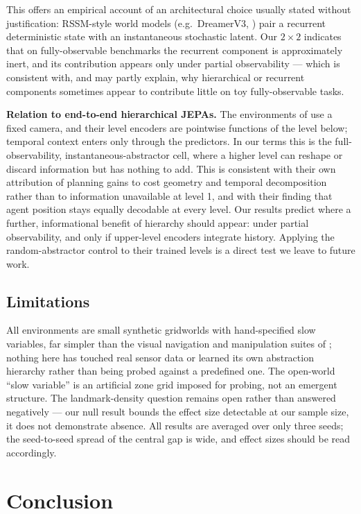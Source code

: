\documentclass[11pt]{article}
\begin{document}
This offers an empirical account of an architectural choice usually stated without justification: RSSM-style world models (e.g.\ DreamerV3, \citealp{hafner2023dreamerv3}) pair a recurrent deterministic state with an instantaneous stochastic latent. Our $2\times2$ indicates that on fully-observable benchmarks the recurrent component is approximately inert, and its contribution appears only under partial observability --- which is consistent with, and may partly explain, why hierarchical or recurrent components sometimes appear to contribute little on toy fully-observable tasks.

\textbf{Relation to end-to-end hierarchical JEPAs.} The environments of \citet{zhang2026hjepa} use a fixed camera, and their level encoders are pointwise functions of the level below; temporal context enters only through the predictors. In our terms this is the full-observability, instantaneous-abstractor cell, where a higher level can reshape or discard information but has nothing to add. This is consistent with their own attribution of planning gains to cost geometry and temporal decomposition rather than to information unavailable at level 1, and with their finding that agent position stays equally decodable at every level. Our results predict where a further, informational benefit of hierarchy should appear: under partial observability, and only if upper-level encoders integrate history. Applying the random-abstractor control to their trained levels is a direct test we leave to future work.

\subsection{Limitations}

All environments are small synthetic gridworlds with hand-specified slow variables, far simpler than the visual navigation and manipulation suites of \citet{zhang2026hjepa}; nothing here has touched real sensor data or learned its own abstraction hierarchy rather than being probed against a predefined one. The open-world ``slow variable'' is an artificial zone grid imposed for probing, not an emergent structure. The landmark-density question remains open rather than answered negatively --- our null result bounds the effect size detectable at our sample size, it does not demonstrate absence. All results are averaged over only three seeds; the seed-to-seed spread of the central gap is wide, and effect sizes should be read accordingly.

\section{Conclusion}
\end{document}
